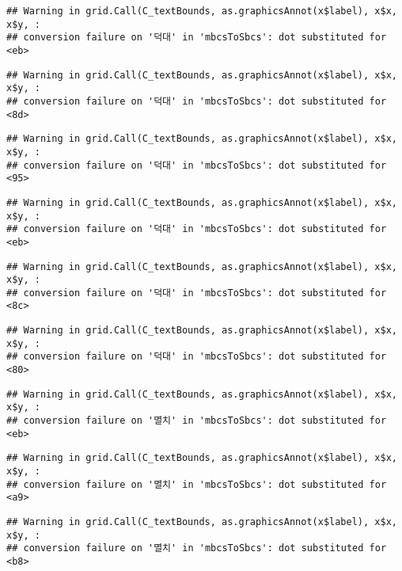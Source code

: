 \documentclass[
]{article}
\begin{document}
\begin{verbatim}
## Warning in grid.Call(C_textBounds, as.graphicsAnnot(x$label), x$x, x$y, :
## conversion failure on '덕대' in 'mbcsToSbcs': dot substituted for <eb>
\end{verbatim}

\begin{verbatim}
## Warning in grid.Call(C_textBounds, as.graphicsAnnot(x$label), x$x, x$y, :
## conversion failure on '덕대' in 'mbcsToSbcs': dot substituted for <8d>
\end{verbatim}

\begin{verbatim}
## Warning in grid.Call(C_textBounds, as.graphicsAnnot(x$label), x$x, x$y, :
## conversion failure on '덕대' in 'mbcsToSbcs': dot substituted for <95>
\end{verbatim}

\begin{verbatim}
## Warning in grid.Call(C_textBounds, as.graphicsAnnot(x$label), x$x, x$y, :
## conversion failure on '덕대' in 'mbcsToSbcs': dot substituted for <eb>
\end{verbatim}

\begin{verbatim}
## Warning in grid.Call(C_textBounds, as.graphicsAnnot(x$label), x$x, x$y, :
## conversion failure on '덕대' in 'mbcsToSbcs': dot substituted for <8c>
\end{verbatim}

\begin{verbatim}
## Warning in grid.Call(C_textBounds, as.graphicsAnnot(x$label), x$x, x$y, :
## conversion failure on '덕대' in 'mbcsToSbcs': dot substituted for <80>
\end{verbatim}

\begin{verbatim}
## Warning in grid.Call(C_textBounds, as.graphicsAnnot(x$label), x$x, x$y, :
## conversion failure on '멸치' in 'mbcsToSbcs': dot substituted for <eb>
\end{verbatim}

\begin{verbatim}
## Warning in grid.Call(C_textBounds, as.graphicsAnnot(x$label), x$x, x$y, :
## conversion failure on '멸치' in 'mbcsToSbcs': dot substituted for <a9>
\end{verbatim}

\begin{verbatim}
## Warning in grid.Call(C_textBounds, as.graphicsAnnot(x$label), x$x, x$y, :
## conversion failure on '멸치' in 'mbcsToSbcs': dot substituted for <b8>
\end{verbatim}
\end{document}
